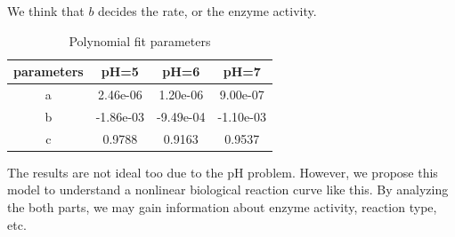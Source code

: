 We think that $b$ decides the rate, or the enzyme activity. 

\begin{table}[!h]
	\centering
	\caption{Polynomial fit parameters}
	\begin{tabular}{cccc}
		\toprule
		parameters & pH=5  & pH=6  & pH=7 \\
		\midrule
		a     & 2.46e-06 & 1.20e-06 & 9.00e-07 \\
		b     & -1.86e-03 & -9.49e-04 & -1.10e-03 \\
		c     & 0.9788 & 0.9163 & 0.9537 \\
		\bottomrule
	\end{tabular}%
	\label{tab:para}%
\end{table}%

The results are not ideal too due to the pH problem. However, we propose this model to understand a nonlinear biological reaction curve like this. By analyzing the both parts, we may gain information about enzyme activity, reaction type, etc.


